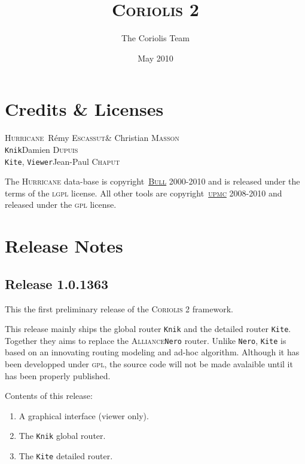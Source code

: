 \documentclass[11pt]{article}
\newcommand {\Chaput}             {\textsc{Chaput}\xspace}
\newcommand {\Dupuis}             {\textsc{Dupuis}\xspace}
\newcommand {\Escassut}           {\textsc{Escassut}\xspace}
\newcommand {\Masson}             {\textsc{Masson}\xspace}
\newcommand {\LGPL}               {\textsc{lgpl}\xspace}
\newcommand {\GPL}                {\textsc{gpl}\xspace}
\newcommand {\Bull}               {\href{http://www.bull.com/}{\textsc{Bull}}\xspace}
\newcommand {\UPMC}               {\href{http://www.upmc.fr/}{\textsc{upmc}}\xspace}
\newcommand {\Alliance}           {\textsc{Alliance}\xspace}
\newcommand {\Nero}               {\texttt{Nero}\xspace}
\newcommand {\CoriolisII}         {\textsc{Coriolis 2}\xspace}
\newcommand {\Hurricane}          {\textsc{Hurricane}\xspace}
\newcommand {\Knik}               {\texttt{Knik}\xspace}
\newcommand {\Kite}               {\texttt{Kite}\xspace}
\newcommand {\Viewer}             {\texttt{Viewer}\xspace}
\begin{document}
 \title{\CoriolisII}
 \author{The Coriolis Team}
 \date{May 2010}

 \maketitle

 \thispagestyle{fancy}

 \tableofcontents

 \section{Credits \& Licenses}

 \begin{center}
   \Hurricane     \dotfill\      Rémy \Escassut \& Christian \Masson   \\
   \Knik          \dotfill     Damien \Dupuis   \\
   \Kite, \Viewer \dotfill  Jean-Paul \Chaput   \\
 \end{center}

 The \Hurricane data-base is copyright\textcopyright\ \Bull 2000-2010 and is
 released under the terms of the \LGPL license. All other tools are
 copyright\textcopyright\ \UPMC 2008-2010 and released under the \GPL
 license. 

 \newpage


 \section{Release Notes}

 \subsection{Release 1.0.1363}

 This the first preliminary release of the \CoriolisII framework.

 This release mainly ships the global router \Knik and the detailed router
 \Kite. Together they aims to replace the \Alliance \Nero router.
 Unlike \Nero, \Kite is based on an innovating routing modeling and ad-hoc
 algorithm. Although it has been developped under \GPL, the source code
 will not be made avalaible until it has been properly published.
 \medskip

 \noindent Contents of this release:
 \begin{enumerate}
   \item A graphical interface (viewer only).
   \item The \Knik global router.
   \item The \Kite detailed router.
 \end{enumerate}
\end{document}
